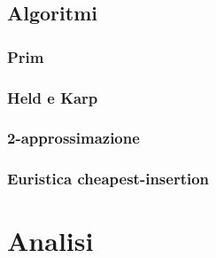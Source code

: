 \documentclass[]{article}
\begin{document}
\subsection{Algoritmi}
\subsubsection{Prim}
\subsubsection{Held e Karp}
\subsubsection{2-approssimazione}
\subsubsection{Euristica cheapest-insertion}

\section{Analisi}

\end{document}
